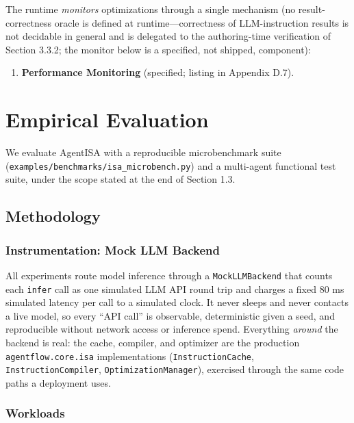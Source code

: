 \documentclass[
  sigconf,
  anonymous]{acmart}
\providecommand{\tightlist}{%
  \setlength{\itemsep}{0pt}\setlength{\parskip}{0pt}}
\begin{document}
The runtime \emph{monitors} optimizations through a single mechanism (no
result-correctness oracle is defined at runtime---correctness of
LLM-instruction results is not decidable in general and is delegated to
the authoring-time verification of Section 3.3.2; the monitor below is a
specified, not shipped, component):

\begin{enumerate}
\def\labelenumi{\arabic{enumi}.}
\tightlist
\item
  \textbf{Performance Monitoring} (specified; listing in Appendix D.7).
\end{enumerate}

\section{Empirical Evaluation}\label{empirical-evaluation}

We evaluate AgentISA with a reproducible microbenchmark suite
(\texttt{examples/benchmarks/isa\_microbench.py}) and a multi-agent
functional test suite, under the scope stated at the end of Section 1.3.

\subsection{Methodology}\label{methodology}

\subsubsection{Instrumentation: Mock LLM
Backend}\label{instrumentation-mock-llm-backend}

All experiments route model inference through a \texttt{MockLLMBackend}
that counts each \texttt{infer} call as one simulated LLM API round trip
and charges a fixed 80 ms simulated latency per call to a simulated
clock. It never sleeps and never contacts a live model, so every ``API
call'' is observable, deterministic given a seed, and reproducible
without network access or inference spend. Everything \emph{around} the
backend is real: the cache, compiler, and optimizer are the production
\texttt{agentflow.core.isa} implementations (\texttt{InstructionCache},
\texttt{InstructionCompiler}, \texttt{OptimizationManager}), exercised
through the same code paths a deployment uses.

\subsubsection{Workloads}\label{workloads}
\end{document}
